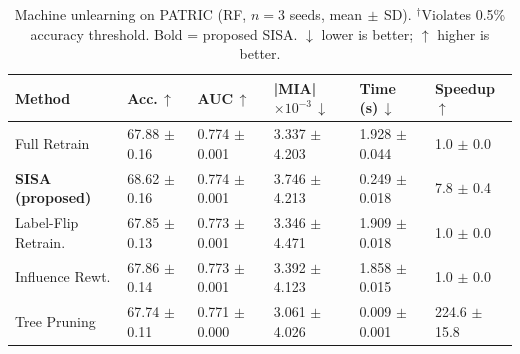 \begin{table}[htbp]
\centering
\caption{Machine unlearning on PATRIC (RF, $n=3$ seeds, mean$\,\pm\,$SD). $^\dagger$Violates 0.5\% accuracy threshold. Bold = proposed SISA. $\downarrow$ lower is better; $\uparrow$ higher is better.}
\label{tab:patric_rf}
\renewcommand{\arraystretch}{1.25}
\begin{tabular}{L{3.2cm} C{2.3cm} C{2.0cm} C{2.2cm} C{2.4cm} C{1.8cm}}
\toprule
\textbf{Method} & \textbf{Acc.\,$\uparrow$} & \textbf{AUC\,$\uparrow$} & \textbf{|MIA|$\times10^{-3}$\,$\downarrow$} & \textbf{Time (s)\,$\downarrow$} & \textbf{Speedup\,$\uparrow$} \\
\midrule
Full Retrain & 67.88 $\pm$ 0.16 & 0.774 $\pm$ 0.001 & 3.337 $\pm$ 4.203 & 1.928 $\pm$ 0.044 & 1.0 $\pm$ 0.0 \\
\textbf{SISA (proposed)} & 68.62 $\pm$ 0.16 & 0.774 $\pm$ 0.001 & 3.746 $\pm$ 4.213 & 0.249 $\pm$ 0.018 & 7.8 $\pm$ 0.4 \\
Label-Flip Retrain. & 67.85 $\pm$ 0.13 & 0.773 $\pm$ 0.001 & 3.346 $\pm$ 4.471 & 1.909 $\pm$ 0.018 & 1.0 $\pm$ 0.0 \\
Influence Rewt. & 67.86 $\pm$ 0.14 & 0.773 $\pm$ 0.001 & 3.392 $\pm$ 4.123 & 1.858 $\pm$ 0.015 & 1.0 $\pm$ 0.0 \\
Tree Pruning & 67.74 $\pm$ 0.11 & 0.771 $\pm$ 0.000 & 3.061 $\pm$ 4.026 & 0.009 $\pm$ 0.001 & 224.6 $\pm$ 15.8 \\
\bottomrule
\end{tabular}
\end{table}